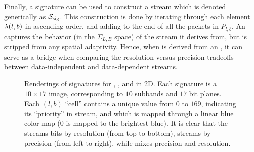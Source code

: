 Finally, a signature can be used to construct a stream which is denoted generically as $\ssig$. This
construction is done by iterating through each element $\sgn(l,b)$ in ascending order, and adding to
the end of \ssig all the packets in $P_{l,b}$. An \ssig captures the behavior (in the $\Sigma_{L,B}$
space) of the stream it derives from, but is stripped from any spatial adaptivity. Hence, when \ssig
is derived from an \sopt, it can serve as a bridge when comparing the resolution-versus-precision
tradeoffs between data-independent and data-dependent streams.

\begin{figure}[t]
\centering
\caption{Renderings of signatures for \slvl, \sbit, and \swav in 2D. Each signature is a $10\times
17$ image, corresponding to $10$ subbands and $17$ bit planes. Each $(l,b)$ ``cell'' contains a
unique value from $0$ to $169$, indicating its ``priority'' in stream, and which is mapped through a
linear blue color map ($0$ is mapped to the brightest blue). It is clear that the \slvl streams bits
by resolution (from top to bottom), \sbit streams by precision (from left to right), while \swav
mixes precision and resolution.}
\label{fig:example-signatures}
\end{figure}
